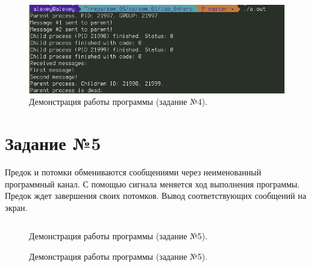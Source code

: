 \documentclass[12pt]{report}
\begin{document}
\begin{figure}[H]

	\centering

	\includegraphics[width=\linewidth]{img/task04.png}
	\caption{Демонстрация работы программы (задание №4).}

	\label{fig:task04}

\end{figure}

\section*{Задание №5}

Предок и потомки обмениваются сообщениями через неименованный
программный канал. С помощью сигнала меняется ход выполнения программы. Предок ждет завершения своих потомков. Вывод соответствующих сообщений на экран.

\begin{lstlisting}[label=some-code,caption=Использование сигналов,language=C]
\end{lstlisting}

\begin{figure}[H]

	\centering

	\caption{Демонстрация работы программы (задание №5).}

	\label{fig:task05_01}

\end{figure}

\begin{figure}[h]

	\centering

	\caption{Демонстрация работы программы (задание №5).}

	\label{fig:task05_02}

\end{figure}



\end{document}
